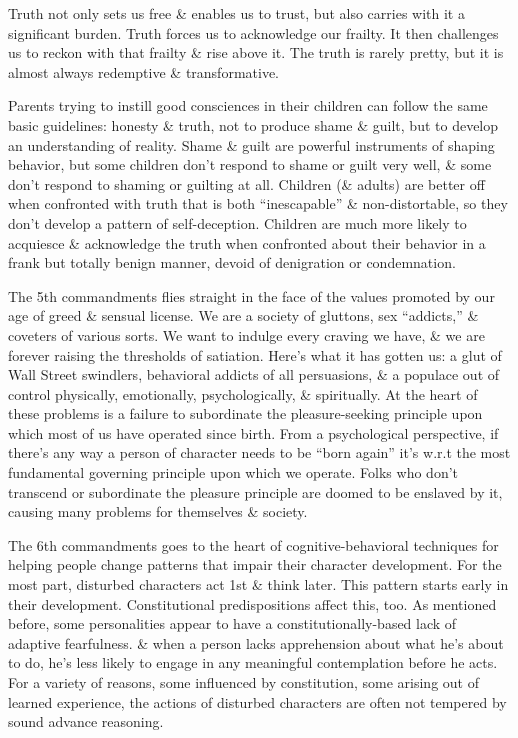 \documentclass{article}
\numberwithin{equation}{section}
\begin{document}
Truth not only sets us free \& enables us to trust, but also carries with it a significant burden. Truth forces us to acknowledge our frailty. It then challenges us to reckon with that frailty \& rise above it. The truth is rarely pretty, but it is almost always redemptive \& transformative.

Parents trying to instill good consciences in their children can follow the same basic guidelines: honesty \& truth, not to produce shame \& guilt, but to develop an understanding of reality. Shame \& guilt are powerful instruments of shaping behavior, but some children don't respond to shame or guilt very well, \& some don't respond to shaming or guilting at all. Children (\& adults) are better off when confronted with truth that is both ``inescapable'' \& non-distortable, so they don't develop a pattern of self-deception. Children are much more likely to acquiesce \& acknowledge the truth when confronted about their behavior in a frank but totally benign manner, devoid of denigration or condemnation.

The 5th commandments flies straight in the face of the values promoted by our age of greed \& sensual license. We are a society of gluttons, sex ``addicts,'' \& coveters of various sorts. We want to indulge every craving we have, \& we are forever raising the thresholds of satiation. Here's what it has gotten us: a glut of Wall Street swindlers, behavioral addicts of all persuasions, \& a populace out of control physically, emotionally, psychologically, \& spiritually. At the heart of these problems is a failure to subordinate the pleasure-seeking principle upon which most of us have operated since birth. From a psychological perspective, if there's any way a person of character needs to be ``born again'' it's w.r.t the most fundamental governing principle upon which we operate. Folks who don't transcend or subordinate the pleasure principle are doomed to be enslaved by it, causing many problems for themselves \& society.

The 6th commandments goes to the heart of cognitive-behavioral techniques for helping people change patterns that impair their character development. For the most part, disturbed characters act 1st \& think later. This pattern starts early in their development. Constitutional predispositions affect this, too. As mentioned before, some personalities appear to have a constitutionally-based lack of adaptive fearfulness. \& when a person lacks apprehension about what he's about to do, he's less likely to engage in any meaningful contemplation before he acts. For a variety of reasons, some influenced by constitution, some arising out of learned experience, the actions of disturbed characters are often not tempered by sound advance reasoning.
\end{document}
